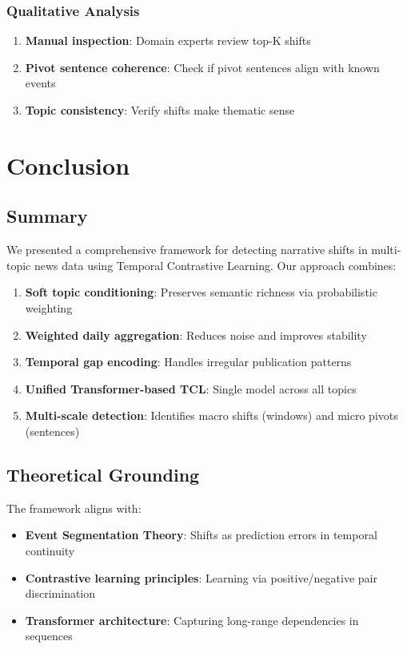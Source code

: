 \documentclass[12pt]{article}
\begin{document}
\subsubsection{Qualitative Analysis}

\begin{enumerate}
    \item \textbf{Manual inspection}: Domain experts review top-K shifts
    \item \textbf{Pivot sentence coherence}: Check if pivot sentences align with known events
    \item \textbf{Topic consistency}: Verify shifts make thematic sense
\end{enumerate}

\newpage

\section{Conclusion}

\subsection{Summary}

We presented a comprehensive framework for detecting narrative shifts in multi-topic news data using Temporal Contrastive Learning. Our approach combines:

\begin{enumerate}
    \item \textbf{Soft topic conditioning}: Preserves semantic richness via probabilistic weighting
    \item \textbf{Weighted daily aggregation}: Reduces noise and improves stability
    \item \textbf{Temporal gap encoding}: Handles irregular publication patterns
    \item \textbf{Unified Transformer-based TCL}: Single model across all topics
    \item \textbf{Multi-scale detection}: Identifies macro shifts (windows) and micro pivots (sentences)
\end{enumerate}

\subsection{Theoretical Grounding}

The framework aligns with:
\begin{itemize}
    \item \textbf{Event Segmentation Theory}: Shifts as prediction errors in temporal continuity
    \item \textbf{Contrastive learning principles}: Learning via positive/negative pair discrimination
    \item \textbf{Transformer architecture}: Capturing long-range dependencies in sequences
\end{itemize}
\end{document}
